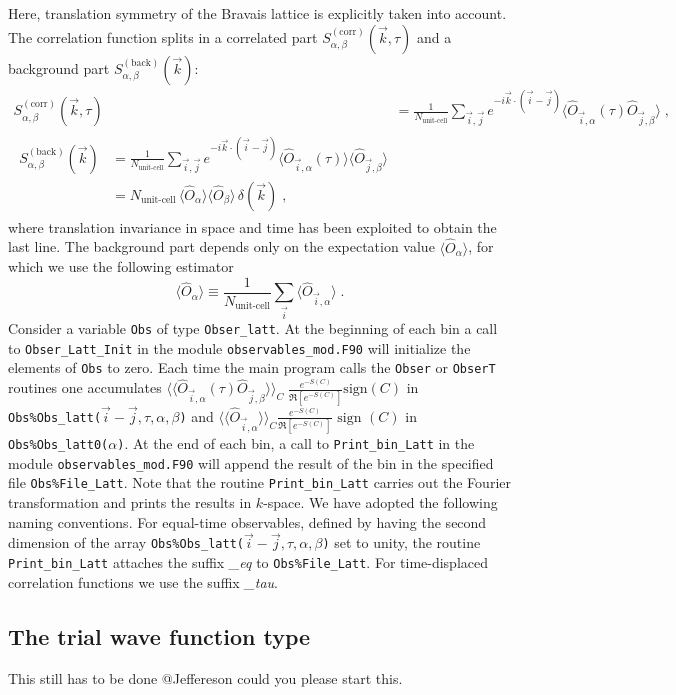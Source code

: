 %
Here,  translation symmetry of the Bravais lattice is explicitly taken into account. 
The correlation function splits in a correlated part $S_{\alpha,\beta}^{\mathrm{(corr)}}(\vec{k},\tau)$ and a background part $S_{\alpha,\beta}^{\mathrm{(back)}}(\vec{k})$:
\begin{align}
S_{\alpha,\beta}^{\mathrm{(corr)}}(\vec{k},\tau)
&=
\frac{1}{N_{\text{unit-cell}}} \sum_{\vec{i},\vec{j}}  e^{- i\vec{k} \cdot \left( \vec{i}-\vec{j}\right) }  \langle \hat{O}_{\vec{i},\alpha} (\tau) \hat{O}_{\vec{j},\beta} \rangle \label{eqn:s_corr} \;,\\
\begin{split}
S_{\alpha,\beta}^{\mathrm{(back)}}(\vec{k})
&=
\frac{1}{N_{\text{unit-cell}}} \sum_{\vec{i},\vec{j}}  e^{- i\vec{k} \cdot \left( \vec{i}-\vec{j}\right) }  \langle \hat{O}_{\vec{i},\alpha} (\tau)\rangle \langle \hat{O}_{\vec{j},\beta} \rangle\\
&=
N_{\text{unit-cell}}\, \langle \hat{O}_{\alpha} \rangle \langle \hat{O}_{\beta} \rangle \, \delta(\vec{k}) \label{eqn:s_back}\;,
\end{split}
\end{align}
where translation invariance in space and time has been exploited to obtain the last line. 
The background part depends only on the expectation value $\langle \hat{O}_{\alpha} \rangle$, for which we use the following estimator 
\begin{equation}\label{eqn:o}
\langle \hat{O}_{\alpha} \rangle \equiv \frac{1}{N_{\text{unit-cell}}} \sum\limits_{\vec{i}} \langle \hat{O}_{\vec{i},\alpha} \rangle\;.
\end{equation}
Consider a variable  \texttt{Obs} of type  \texttt{Obser\_latt}. At the beginning of each bin a call to  \texttt{Obser\_Latt\_Init} in the module \texttt{observables\_mod.F90}  will  initialize  the elements of \texttt{Obs} to zero.    Each time the main program calls the   \texttt{Obser} or  \texttt{ObserT} routines one accumulates $ \langle \langle \hat{O}_{\vec{i},\alpha} (\tau) \hat{O}_{\vec{j},\beta} \rangle \rangle_{C} \; \frac{e^{-S(C)}} {\Re \left[e^{-S(C)} \right]}  \text{sign}(C) $    in  \texttt{Obs\%Obs\_latt($\vec{i}-\vec{j},\tau,\alpha,\beta$)}   
and $ \langle \langle \hat{O}_{\vec{i},\alpha} \rangle \rangle_{C}\frac{e^{-S(C)}} {\Re \left[e^{-S(C)} \right]}  \text{ sign }(C) $  in \texttt{Obs\%Obs\_latt0($\alpha$)}.   At the end of each bin, a call to \texttt{Print\_bin\_Latt} in the module  \texttt{observables\_mod.F90}   will append the result of the bin in the specified  file \texttt{Obs\%File\_Latt}.   Note that the routine  \texttt{Print\_bin\_Latt}  carries out the Fourier transformation and prints the results in $k$-space. 
We have adopted the following naming conventions.
For equal-time observables, defined by having the second dimension of the array  \texttt{Obs\%Obs\_latt($\vec{i}-\vec{j},\tau,\alpha,\beta$)}   set to unity, 
the routine \texttt{Print\_bin\_Latt}  attaches the suffix \emph{\_eq} to \texttt{Obs\%File\_Latt}.  For time-displaced correlation functions we use the suffix \emph{\_tau}.

\subsection{The trial wave function type}
{\color{red}   This still has to be done @Jeffereson could you please start this. }


